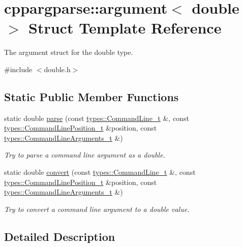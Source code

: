 \hypertarget{structcppargparse_1_1argument_3_01double_01_4}{}\section{cppargparse\+:\+:argument$<$ double $>$ Struct Template Reference}
\label{structcppargparse_1_1argument_3_01double_01_4}


The argument struct for the double type.  




{\ttfamily \#include $<$double.\+h$>$}

\subsection*{Static Public Member Functions}
\begin{DoxyCompactItemize}
\item 
static double \hyperlink{structcppargparse_1_1argument_3_01double_01_4_aa587b4a64888fd195328d2491f893bc5}{parse} (const \hyperlink{types_8h_a80adf2418b7ce9fe616698efa7533ecf}{types\+::\+Command\+Line\+\_\+t} \&, const \hyperlink{types_8h_a43b4f43f8940de1bf09ced6f1b668053}{types\+::\+Command\+Line\+Position\+\_\+t} \&position, const \hyperlink{types_8h_a003c660afe2ee9c6cc39aea966e8926d}{types\+::\+Command\+Line\+Arguments\+\_\+t} \&)
\begin{DoxyCompactList}\small\item\em Try to parse a command line argument as a double. \end{DoxyCompactList}\item 
static double \hyperlink{structcppargparse_1_1argument_3_01double_01_4_a19756d869b671553629d509f18549903}{convert} (const \hyperlink{types_8h_a80adf2418b7ce9fe616698efa7533ecf}{types\+::\+Command\+Line\+\_\+t} \&, const \hyperlink{types_8h_a43b4f43f8940de1bf09ced6f1b668053}{types\+::\+Command\+Line\+Position\+\_\+t} \&position, const \hyperlink{types_8h_a003c660afe2ee9c6cc39aea966e8926d}{types\+::\+Command\+Line\+Arguments\+\_\+t} \&)
\begin{DoxyCompactList}\small\item\em Try to convert a command line argument to a double value. \end{DoxyCompactList}\end{DoxyCompactItemize}


\subsection{Detailed Description}
